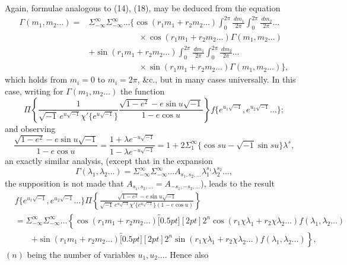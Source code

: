 \documentclass[11pt]{article}
\providecommand{\dd}{\,d}
\providecommand{\br}[1]{\overbracket[0.5pt][2pt]{#1}}
\begin{document}
Again, formulae analogous to (14), (18), may be deduced from the equation
\begin{equation}
\begin{aligned}
\Gamma(m_1,m_2\ldots)
={}&\Sigma_{-\infty}^{\infty}\Sigma_{-\infty}^{\infty}\ldots\Bigg\{
\cos(r_1m_1+r_2m_2\ldots)
\int_{0}^{2\pi}\frac{\dd m_1}{2\pi}
\int_{0}^{2\pi}\frac{\dd m_2}{2\pi}\ldots\\
&\qquad\qquad\qquad\times
\cos(r_1m_1+r_2m_2\ldots)\Gamma(m_1,m_2\ldots)\\
&+\sin(r_1m_1+r_2m_2\ldots)
\int_{0}^{2\pi}\frac{\dd m_1}{2\pi}
\int_{0}^{2\pi}\frac{\dd m_2}{2\pi}\ldots\\
&\qquad\qquad\qquad\times
\sin(r_1m_1+r_2m_2\ldots)\Gamma(m_1,m_2\ldots)\Bigg\},
\end{aligned}\tag{39}
\end{equation}
which holds from $m_i=0$ to $m_i=2\pi$, \&c., but in many cases universally. In this
case, writing for $\Gamma(m_1,m_2\ldots)$ the function
\[
\Pi\left\{\frac{1}{\sqrt{-1}\,e^{u\sqrt{-1}}\chi'\{e^{u\sqrt{-1}}\}}
\frac{\sqrt{1-e^{2}}-e\sin u\sqrt{-1}}{1-e\cos u}\right\}
f\{e^{u_1\sqrt{-1}},e^{u_2\sqrt{-1}}\ldots\} \tag{40};
\]
and observing
\[
\frac{\sqrt{1-e^{2}}-e\sin u\sqrt{-1}}{1-e\cos u}
=\frac{1+\lambda e^{-u\sqrt{-1}}}{1-\lambda e^{-u\sqrt{-1}}}
=1+2\Sigma_{1}^{\infty}\{\cos su-\sqrt{-1}\sin su\}\lambda^{s} \tag{41},
\]
an exactly similar analysis, (except that in the expansion
\[
\Gamma(\lambda_1,\lambda_2\ldots)=\Sigma_{-\infty}^{\infty}\Sigma_{-\infty}^{\infty}\ldots
A_{s_1,s_2,\ldots}\lambda_1^{s_1}\lambda_2^{s_2}\ldots,
\]
the supposition is not made that $A_{s_1,s_2,\ldots}=A_{-s_1,-s_2,\ldots}$), leads to the result
\begin{equation}
\begin{aligned}
&f\{e^{u_1\sqrt{-1}},e^{u_2\sqrt{-1}}\ldots\}
\Pi\left\{\frac{\sqrt{1-e^{2}}-e\sin u\sqrt{-1}}
{\sqrt{-1}\,e^{u\sqrt{-1}}\chi'\{e^{u\sqrt{-1}}\}(1-e\cos u)}\right\}\\
&=\Sigma_{-\infty}^{\infty}\Sigma_{-\infty}^{\infty}\ldots\left\{
\cos(r_1m_1+r_2m_2\ldots)\br{2^{n}\cos(r_1\chi\lambda_1+r_2\chi\lambda_2\ldots)f(\lambda_1,\lambda_2\ldots)}\right.\\
&\qquad\left.
+\sin(r_1m_1+r_2m_2\ldots)\br{2^{n}\sin(r_1\chi\lambda_1+r_2\chi\lambda_2\ldots)f(\lambda_1,\lambda_2\ldots)}
\right\},
\end{aligned}\tag{42}
\end{equation}
$(n)$ being the number of variables $u_1,u_2\ldots$. Hence also
\end{document}
